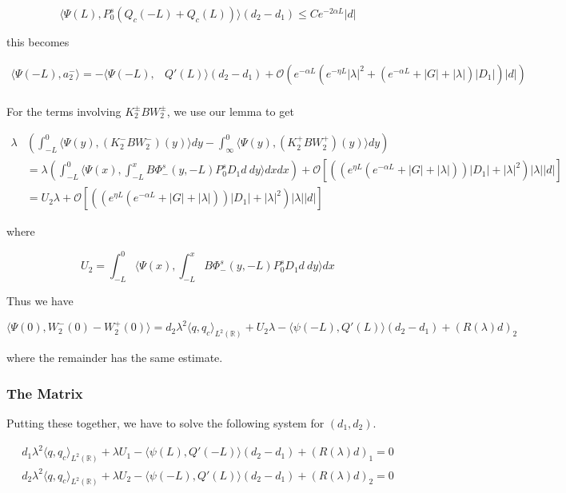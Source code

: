\documentclass[12pt]{article}
\def\R{{\mathbb R}}
\begin{document}
\[
\langle \Psi(L), P_0^s (Q_c(-L) + Q_c(L))\rangle(d_2 - d_1) \leq C e^{-2 \alpha L} |d|
\]

this becomes

\begin{align*}
\langle \Psi(-L), a_2^- \rangle = -\langle \Psi(-L), &Q'(L) \rangle (d_2 - d_1) + \mathcal{O} \left( e^{-\alpha L} (e^{-\eta L}|\lambda|^2 + (e^{-\alpha L} + |G| + |\lambda|)|D_1|)|d| \right)\\
\end{align*}

For the terms involving $K_2^\pm B W_2^\pm$, we use our lemma to get

\begin{align*}
\lambda&\left( \int_{-L}^0 \langle \Psi(y), (K_2^- B W_2^-)(y) \rangle dy - \int_{\infty}^0 \langle \Psi(y), (K_2^+ B W_2^+)(y) \rangle dy \right) \\
&= \lambda \left( \int_{-L}^0 \langle \Psi(x), \int_{-L}^x B \Phi^s_-(y, -L) P_0^s D_1 d  \:dy \rangle dxdx \right) + \mathcal{O} \left[ \left(\left( e^{\eta L}(e^{-\alpha L} + |G| + |\lambda|) \right)|D_1| + |\lambda|^2 \right)|\lambda| |d|\right] \\
&= U_2 \lambda + \mathcal{O} \left[ \left(\left( e^{\eta L}(e^{-\alpha L} + |G| + |\lambda|) \right)|D_1| + |\lambda|^2 \right)|\lambda| |d|\right]
\end{align*}

where

\[
U_2 = \int_{-L}^0 \langle \Psi(x), \int_{-L}^x B \Phi^s_-(y, -L) P_0^s D_1 d  \:dy \rangle dx
\]

Thus we have

\[
\langle \Psi(0), W_2^-(0) - W_2^+(0) \rangle = 
d_2 \lambda^2 \langle q, q_c \rangle_{L^2(\R)} + U_2 \lambda - \langle \psi(-L), Q'(L) \rangle(d_2 - d_1) + (R(\lambda)d)_2
\]

where the remainder has the same estimate. 

\subsubsection*{The Matrix}

Putting these together, we have to solve the following system for $(d_1, d_2)$.

\begin{align*}
d_1 \lambda^2 \langle q, q_c \rangle_{L^2(\R)} + \lambda U_1 - \langle \psi(L), Q'(-L) \rangle(d_2 - d_1) + (R(\lambda)d)_1 = 0\\
d_2 \lambda^2 \langle q, q_c \rangle_{L^2(\R)} + \lambda U_2 - \langle \psi(-L), Q'(L) \rangle(d_2 - d_1) + (R(\lambda)d)_2 = 0
\end{align*}
\end{document}
